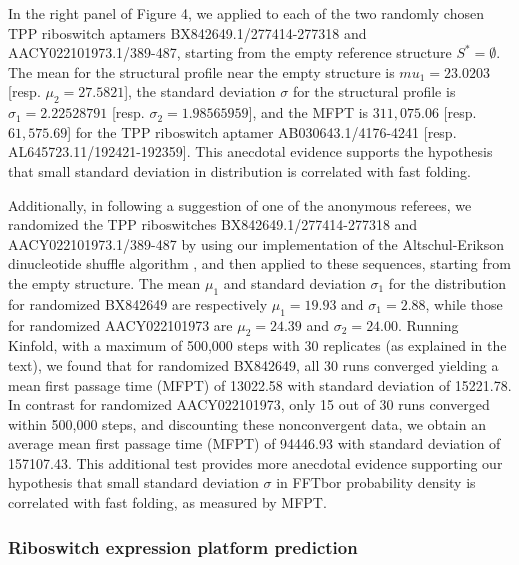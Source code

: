 In the right panel of Figure 4, we
applied \fftbor to each of the two randomly chosen TPP riboswitch
aptamers BX842649.1/277414-277318 and AACY022101973.1/389-487, starting
from the empty reference structure $S^*=\emptyset$.
The mean for the \fftbor structural profile near the empty
structure is $mu_1=23.0203$  [resp. $\mu_2=27.5821$], the
standard deviation $\sigma$ for the \fftbor structural profile
is $\sigma_1=2.22528791$  [resp. $\sigma_2=1.98565959$], and the \kinfold MFPT is
$311,075.06$ [resp. $61,575.69$] for the TPP riboswitch aptamer
AB030643.1/4176-4241 [resp.  AL645723.11/192421-192359]. This anecdotal evidence supports the hypothesis that small standard deviation in \fftbor distribution is correlated with fast folding.

Additionally, in following a suggestion of one of the anonymous referees, we randomized the TPP riboswitches BX842649.1/277414-277318 and AACY022101973.1/389-487 by using our implementation of the Altschul-Erikson dinucleotide shuffle algorithm
\cite{altschulErikson:dinucleotideShuffle}, and then applied \fftbor to these sequences, starting from the empty structure.  The mean $\mu_1$ and standard deviation $\sigma_1$ for the \fftbor distribution for randomized BX842649 are respectively $\mu_1=19.93$ and $\sigma_1=2.88$, while those for randomized AACY022101973 are $\mu_2= 24.39$ and $\sigma_2=24.00$. Running Kinfold, with a maximum of 500,000 steps with 30 replicates (as explained in the text), we found that for randomized BX842649, all 30 runs converged yielding a mean first passage time (MFPT) of 13022.58  with standard deviation of 15221.78. In contrast for randomized AACY022101973, only 15 out of 30 runs converged within 500,000 steps, and discounting these nonconvergent data, we obtain an average mean first passage time (MFPT) of 94446.93  with standard deviation of 157107.43. This additional test provides more anecdotal evidence supporting our hypothesis that small standard deviation $\sigma$ in FFTbor probability density is correlated with fast folding, as measured by MFPT.
%
%

\subsubsection*{Riboswitch expression platform prediction}

